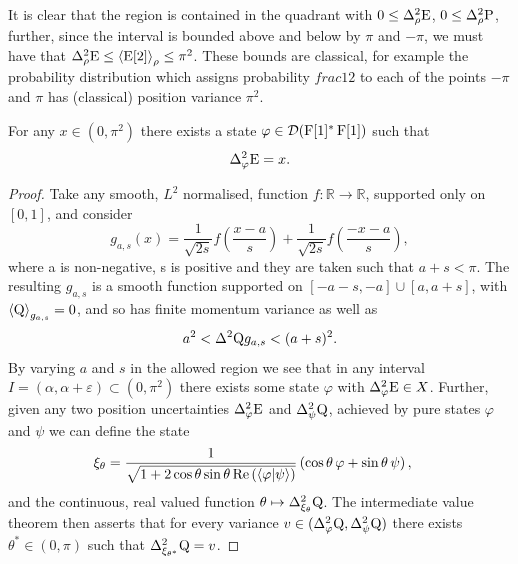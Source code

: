 It is clear that the region is contained in the quadrant with $0 \leq\var[\rho]{\ope}$, $0\leq\var[\rho]{\opp}$, further, since the interval is bounded above and below by $\pi$ and $-\pi$, we must have that $\var[\rho]{\ope} \leq \expe{\ope[2]}{\rho} \leq \pi^2$. These bounds are classical, for example the probability distribution which assigns probability $frac{1}{2}$ to each of the points $-\pi$ and $\pi$ has (classical) position variance $\pi^2$.

\begin{lem}\label{lem:box-ur-all-points-filled}
  For any $x\in (0, \pi^2)$ there exists a state $\varphi\in\mathcal{D}(\operatorname{F}[1]^*\operatorname{F}[1])$  such that 
  \begin{align}
    \var[\varphi]{\ope} = x.
  \end{align}
\end{lem}
\begin{proof}
Take any smooth, $L^2$ normalised, function $f: \mathbb{R} \to \mathbb{R}$, supported only on $[0,1]$, and consider
\begin{equation}
	g_{a,s}(x) = \frac{1}{\sqrt{2s}}f\left(\frac{x-a}{s}\right) +\frac{1}{\sqrt{2s}}f\left(\frac{-x-a}{s}\right),
\end{equation}
where a is non-negative, s is positive and they are taken such that $a+s < \pi$. The resulting $g_{a,s}$ is a smooth function supported on $[-a-s, -a] \cup [a,a+s]$, with $\left\langle{\operatorname{Q}}\right\rangle_{g_{a,s}} = 0$, and so has finite momentum variance as well as
\begin{equation}
	a^2 < \var{\opq}{g_{a,s}} < (a+s)^2.
\end{equation}
By varying $a$ and $s$ in the allowed region we see that in any interval $I = (\alpha, \alpha+\varepsilon) \subset (0,\pi^2)$ there exists some state $\varphi$ with $\var[\varphi]{\ope} \in X$. Further, given any two position uncertainties $\var[\varphi]{\ope}$ and $\var[\psi]{\opq}$, achieved by pure states $\varphi$ and $\psi$ we can define the state
\begin{align}
	\xi_\theta &= \frac{1}{\sqrt{1+2\cos\theta\sin\theta\operatorname{Re}\left(\langle \varphi|\psi\rangle\right)}}\left(\cos\theta\,\varphi + \sin\theta\,\psi \right),
\end{align}
and the continuous, real valued function $\theta\mapsto\var[\xi_\theta]{\opq}$. The intermediate value theorem then asserts that for every variance $v\in(\var[\varphi]{\opq},\var[\psi]{\opq})$ there exists $\theta^*\in(0,\pi)$ such that $\var[\xi_{\theta^*}]{\opq} = v$.
\end{proof}

